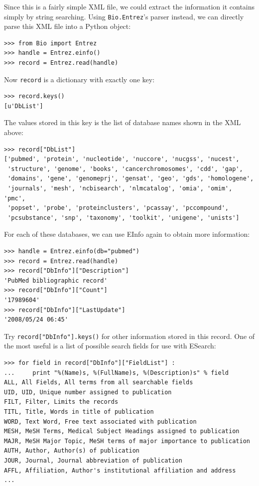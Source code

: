 \documentclass{report}
\begin{document}
Since this is a fairly simple XML file, we could extract the information it contains simply by string searching. Using \verb+Bio.Entrez+'s parser instead, we can directly parse this XML file into a Python object:
\begin{verbatim}
>>> from Bio import Entrez
>>> handle = Entrez.einfo()
>>> record = Entrez.read(handle)
\end{verbatim}
Now \verb+record+ is a dictionary with exactly one key:
\begin{verbatim}
>>> record.keys()
[u'DbList']
\end{verbatim}
The values stored in this key is the list of database names shown in the XML above:
\begin{verbatim}
>>> record["DbList"]
['pubmed', 'protein', 'nucleotide', 'nuccore', 'nucgss', 'nucest',
 'structure', 'genome', 'books', 'cancerchromosomes', 'cdd', 'gap',
 'domains', 'gene', 'genomeprj', 'gensat', 'geo', 'gds', 'homologene',
 'journals', 'mesh', 'ncbisearch', 'nlmcatalog', 'omia', 'omim', 'pmc',
 'popset', 'probe', 'proteinclusters', 'pcassay', 'pccompound',
 'pcsubstance', 'snp', 'taxonomy', 'toolkit', 'unigene', 'unists']
\end{verbatim}

For each of these databases, we can use EInfo again to obtain more information:
\begin{verbatim}
>>> handle = Entrez.einfo(db="pubmed")
>>> record = Entrez.read(handle)
>>> record["DbInfo"]["Description"]
'PubMed bibliographic record'
>>> record["DbInfo"]["Count"]
'17989604'
>>> record["DbInfo"]["LastUpdate"]
'2008/05/24 06:45'
\end{verbatim}
Try \verb+record["DbInfo"].keys()+ for other information stored in this record.
One of the most useful is a list of possible search fields for use with ESearch:

\begin{verbatim}
>>> for field in record["DbInfo"]["FieldList"] :
...     print "%(Name)s, %(FullName)s, %(Description)s" % field
ALL, All Fields, All terms from all searchable fields
UID, UID, Unique number assigned to publication
FILT, Filter, Limits the records
TITL, Title, Words in title of publication
WORD, Text Word, Free text associated with publication
MESH, MeSH Terms, Medical Subject Headings assigned to publication
MAJR, MeSH Major Topic, MeSH terms of major importance to publication
AUTH, Author, Author(s) of publication
JOUR, Journal, Journal abbreviation of publication
AFFL, Affiliation, Author's institutional affiliation and address
...
\end{verbatim}
\end{document}
